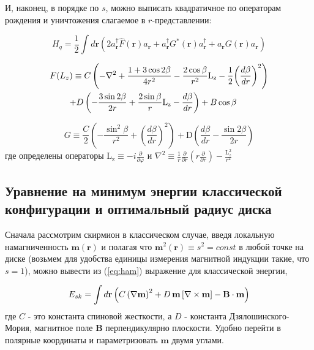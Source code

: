 \documentclass[a4paper,article,14pt]{extarticle}
\begin{document}
И, наконец, в порядке по $s$, можно выписать квадратичное по операторам рождения и уничтожения слагаемое в $r$-представлении:

\begin{equation}
\label{eq:HamQuantBose}
{H_q} = \frac{1}{2}\int {d\mathbf{r} \left( {2a_{\mathbf{r}}^\dag \hat F\left( {\mathbf{r}} \right){a_{\mathbf{r}}} + a_{\mathbf{r}}^\dag G^*\left( {\mathbf{r}} \right)a_{\mathbf{r}}^\dag  + {a_{\mathbf{r}}}{G}\left( {\mathbf{r}} \right){a_{\mathbf{r}}}} \right)}
\end{equation}

\[\begin{gathered}
  F({L_z}) \equiv C\left( { - \nabla ^ 2  + \frac{{1 + 3\cos 2\beta }}{{4{r^2}}} - \frac{{2\cos \beta }}{{{r^2}}}{{\text{L}}_{\text{z}}} - \frac{1}{2}{{\left( {\frac{{d\beta }}{{dr}}} \right)}^2}} \right) \hfill \\
  \,\,\,\,\,\,\,\,\,\,\,\,\,\, + D\left( { - \frac{{3\sin 2\beta }}{{2r}} + \frac{{2\sin \beta }}{r}{{\text{L}}_{\text{z}}} - \frac{{d\beta }}{{dr}}} \right) + B\cos \beta  \hfill \\ 
\end{gathered} \]

\[G \equiv \frac{C}{2}\left( { - \frac{{{{\sin }^2}\beta }}{{{r^2}}} + {{\left( {\frac{{d\beta }}{{dr}}} \right)}^2}} \right) + {\text{D}}\left( {\frac{{d\beta }}{{dr}} - \frac{{\sin 2\beta }}{{2r}}} \right)\]
где определены операторы ${{\text{L}}_{\text{z}}} \equiv  - i\frac{\partial }{{\partial \varphi }}$
и 
$\nabla ^ 2  \equiv \frac{1}{r}\frac{\partial }{{\partial r}}\left( {r\frac{\partial }{{\partial r}}} \right) - \frac{{{\text{L}}_z^2}}{{{r^2}}}$ 


\subsection{Уравнение на минимум энергии классической конфигурации и оптимальный радиус диска}
Сначала рассмотрим скирмион в классическом случае, введя локальную намагниченность $\mathbf{m}(\mathbf{r})$ и полагая что $\mathbf{m}^2(\mathbf{r}) \equiv s^2 = const$ в любой точке на диске (возьмем для удобства единицы измерения магнитной индукции такие, что $s=1$), можно вывести из (\ref{eq:ham}) выражение для классической энергии,

\begin{equation}
\label{eq:en_class}
{E_{sk}} = \int {d{\mathbf{r}}} \left( {C \, {{\left( {\nabla {\bf{m}}} \right)}^2} + D \, {\bf{m}}\left[ {\nabla \times {\bf{m}}} \right] - \textbf{B} \cdot {\bf{m}}} \right)
\end{equation}
где $C$ - это константа спиновой жесткости, а $D$ - константа Дзялошинского-Мория, магнитное поле $\textbf{B}$ перпендикулярно плоскости. Удобно перейти в полярные координаты и параметризовать $\mathbf{m}$ двумя углами.
\end{document}
